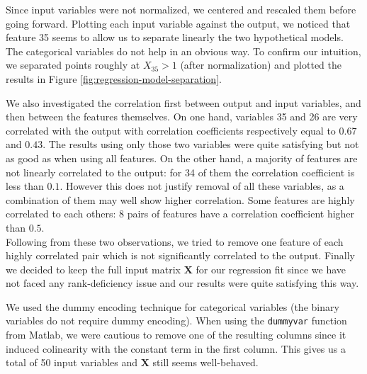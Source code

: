\documentclass{article} %
\begin{document}
  Since input variables were not normalized, we centered and rescaled them before going forward. Plotting each input variable against the output, we noticed that feature 35 seems to allow us to separate linearly the two hypothetical models. The categorical variables do not help in an obvious way. To confirm our intuition, we separated points roughly at $X_{35} > 1$ (after normalization) and plotted the results in Figure \ref{fig:regression-model-separation}.

  We also investigated the correlation first between output and input variables, and then between the features themselves. On one hand, variables 35 and 26 are very correlated with the output with correlation coefficients respectively equal to $0.67$ and $0.43$. The results using only those two variables were quite satisfying but not as good as when using all features. On the other hand, a majority of features are not linearly correlated to the output: for 34 of them the correlation coefficient is less than $0.1$. However this does not justify removal of all these variables, as a combination of them may well show higher correlation. Some features are highly correlated to each others: 8 pairs of features have a correlation coefficient higher than $0.5$.\\
  Following from these two observations, we tried to remove one feature of each highly correlated pair which is not significantly correlated to the output. Finally we decided to keep the full input matrix $\mathbf{X}$ for our regression fit since we have not faced any rank-deficiency issue and our results were quite satisfying this way.

  We used the dummy encoding technique for categorical variables (the binary variables do not require dummy encoding). When using the \texttt{dummyvar} function from Matlab, we were cautious to remove one of the resulting columns since it induced colinearity with the constant term in the first column. This gives us a total of 50 input variables and $\mathbf{X}$ still seems well-behaved.
\end{document}
